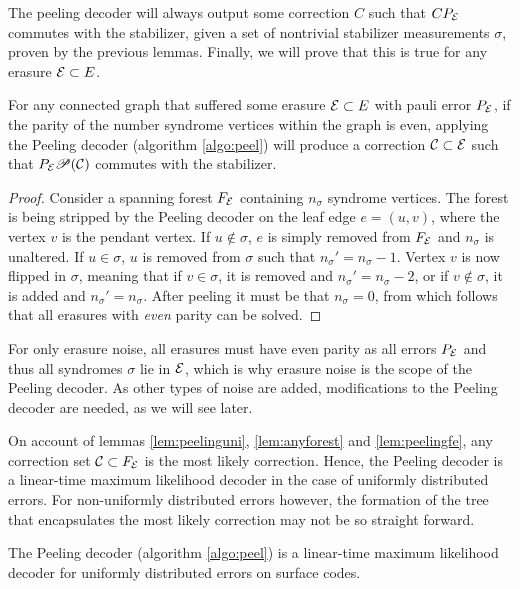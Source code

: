 

The peeling decoder will always output some correction $C$ such that $CP_{\mathcal{E}}$ commutes with the stabilizer, given a set of nontrivial stabilizer measurements $\sigma$, proven by the previous lemmas. Finally, we will prove that this is true for any erasure $\mathcal{E}\subset E$. 
\begin{theorem}\label{eq:anyevenparity}
  For any connected graph that suffered some erasure $\mathcal{E}\subset E$ with pauli error $P_{\mathcal{E}}$, if the parity of the number syndrome vertices within the graph is even, applying the Peeling decoder (algorithm \ref{algo:peel}) will produce a correction $\mathcal{C}\subset \mathcal{E}$ such that $P_{\mathcal{E}}\mathscr{P}(\mathcal{C})$ commutes with the stabilizer.
\end{theorem}
\begin{proof}
  Consider a spanning forest $F_{\mathcal{E}}$ containing $n_\sigma$ syndrome vertices. The forest is being stripped by the Peeling decoder on the leaf edge $e = (u,v)$, where the vertex $v$ is the pendant vertex. If $u\notin\sigma$, $e$ is simply removed from $F_{\mathcal{E}}$ and $n_\sigma$ is unaltered. If $u\in\sigma$, $u$ is removed from $\sigma$ such that $n_\sigma'= n_\sigma -1$. Vertex $v$ is now flipped in $\sigma$, meaning that if $v\in\sigma$, it is removed and $n_\sigma'= n_\sigma -2$, or if  $v\notin\sigma$, it is added and $n_\sigma'= n_\sigma$. After peeling it must be that $n_\sigma=0$, from which follows that all erasures with \emph{even} parity can be solved. 
\end{proof}
For only erasure noise, all erasures must have even parity as all errors $P_{\mathcal{E}}$ and thus all syndromes $\sigma$ lie in $\mathcal{E}$, which is why erasure noise is the scope of the Peeling decoder. As other types of noise are added, modifications to the Peeling decoder are needed, as we will see later. 

On account of lemmas \ref{lem:peelinguni}, \ref{lem:anyforest} and \ref{lem:peelingfe}, any correction set $\mathcal{C}\subset F_{\mathcal{E}}$ is the most likely correction.  Hence, the Peeling decoder is a linear-time maximum likelihood decoder in the case of uniformly distributed errors. For non-uniformly distributed errors however, the formation of the tree that encapsulates the most likely correction may not be so straight forward. 
\begin{theorem}
  The Peeling decoder (algorithm \ref{algo:peel}) is a linear-time maximum likelihood decoder for uniformly distributed errors on surface codes. 
\end{theorem}

